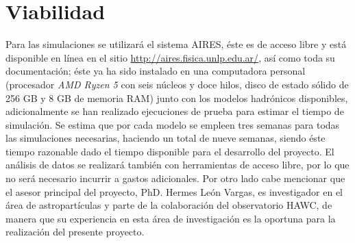 %
%
%

\section{Viabilidad}
Para las simulaciones se utilizará el sistema AIRES, éste es de acceso libre y está disponible en línea en el sitio \url{http://aires.fisica.unlp.edu.ar/}, así como toda su documentación; éste ya ha sido instalado en una computadora personal (procesador \textit{AMD Ryzen 5} con seis n\'ucleos y doce hilos, disco de estado s\'olido de 256 GB y 8 GB de memoria RAM) junto con los modelos hadrónicos disponibles, adicionalmente se han realizado ejecuciones de prueba para estimar el tiempo de simulación. Se estima que por cada modelo se empleen tres semanas para todas las simulaciones necesarias, haciendo un total de nueve semanas, siendo éste tiempo razonable dado el tiempo disponible para el desarrollo del proyecto. El an\'alisis de datos se realizar\'a tambi\'en con herramientas de acceso libre, por lo que no ser\'a necesario incurrir a gastos adicionales. Por otro lado cabe mencionar que el asesor principal del proyecto, PhD. Hermes Le\'on Vargas, es investigador en el \'area de astropart\'iculas y parte de la colaboraci\'on del observatorio HAWC, de manera que su experiencia en esta \'area de investigaci\'on es la oportuna para la realizaci\'on del presente proyecto. \\ 

\singlespace
